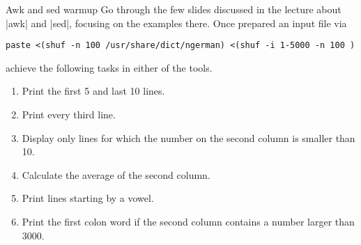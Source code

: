 
\begin{exercise}[Instructive]{Awk and sed warmup}
    Go through the few slides discussed in the lecture about \bash|awk| and \bash|sed|, focusing on the examples there.
    Once prepared an input file via
    \begin{lstlisting}[style=MyBash]
        paste <(shuf -n 100 /usr/share/dict/ngerman) <(shuf -i 1-5000 -n 100 )
    \end{lstlisting}
    achieve the following tasks in either of the tools.
    \begin{enumerate}
        \item Print the first 5 and last 10 lines.
        \item Print every third line.
        \item Display only lines for which the number on the second column is smaller than 10.
        \item Calculate the average of the second column.
        \item Print lines starting by a vowel.
        \item Print the first colon word if the second column contains a number larger than 3000.
    \end{enumerate}
\end{exercise}

\bigskip

